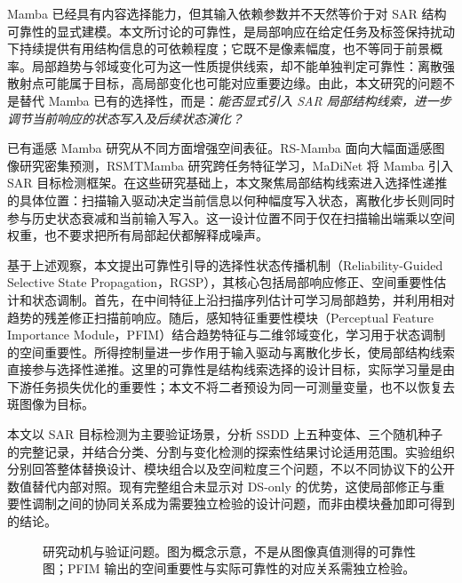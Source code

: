 \documentclass[UTF8,11pt,a4paper,fontset=fandol]{ctexart}
\begin{document}
Mamba 已经具有内容选择能力，但其输入依赖参数并不天然等价于对 SAR 结构可靠性的显式建模。本文所讨论的可靠性，是局部响应在给定任务及标签保持扰动下持续提供有用结构信息的可依赖程度；它既不是像素幅度，也不等同于前景概率。局部趋势与邻域变化可为这一性质提供线索，却不能单独判定可靠性：离散强散射点可能属于目标，高局部变化也可能对应重要边缘。由此，本文研究的问题不是替代 Mamba 已有的选择性，而是：\emph{能否显式引入 SAR 局部结构线索，进一步调节当前响应的状态写入及后续状态演化？}

已有遥感 Mamba 研究从不同方面增强空间表征。RS-Mamba 面向大幅面遥感图像研究密集预测\cite{rsmamba2024}，RSMTMamba 研究跨任务特征学习\cite{rstmtmamba2025}，MaDiNet 将 Mamba 引入 SAR 目标检测框架\cite{madinet2025}。在这些研究基础上，本文聚焦局部结构线索进入选择性递推的具体位置：扫描输入驱动决定当前信息以何种幅度写入状态，离散化步长则同时参与历史状态衰减和当前输入写入。这一设计位置不同于仅在扫描输出端乘以空间权重，也不要求把所有局部起伏都解释成噪声。

基于上述观察，本文提出可靠性引导的选择性状态传播机制（Reliability-Guided Selective State Propagation，RGSP），其核心包括局部响应修正、空间重要性估计和状态调制。首先，在中间特征上沿扫描序列估计可学习局部趋势，并利用相对趋势的残差修正扫描前响应。随后，感知特征重要性模块（Perceptual Feature Importance Module，PFIM）结合趋势特征与二维邻域变化，学习用于状态调制的空间重要性。所得控制量进一步作用于输入驱动与离散化步长，使局部结构线索直接参与选择性递推。这里的可靠性是结构线索选择的设计目标，实际学习量是由下游任务损失优化的重要性；本文不将二者预设为同一可测量变量，也不以恢复去斑图像为目标。

本文以 SAR 目标检测为主要验证场景，分析 SSDD 上五种变体、三个随机种子的完整记录，并结合分类、分割与变化检测的探索性结果讨论适用范围。实验组织分别回答整体替换设计、模块组合以及空间粒度三个问题，不以不同协议下的公开数值替代内部对照。现有完整组合未显示对 DS-only 的优势，这使局部修正与重要性调制之间的协同关系成为需要独立检验的设计问题，而非由模块叠加即可得到的结论。

\begin{figure}[tbp]
\centering
{}
\caption{研究动机与验证问题。图为概念示意，不是从图像真值测得的可靠性图；PFIM 输出的空间重要性与实际可靠性的对应关系需独立检验。}
\label{fig:motivation}
\end{figure}
\end{document}
